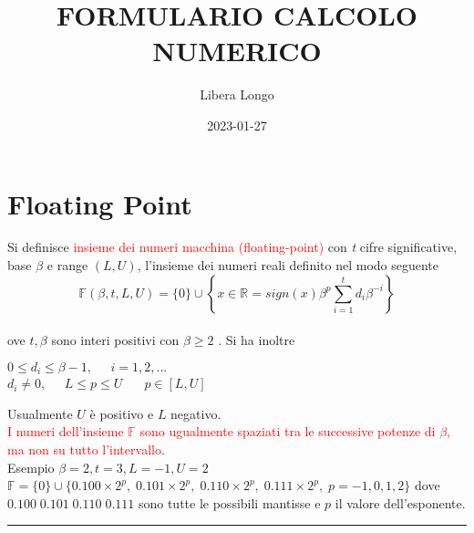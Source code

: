 \documentclass{article}
\title{FORMULARIO CALCOLO NUMERICO}
\date{2023-01-27}
\author{Libera Longo}
\begin{document}
	\maketitle
	\section{Floating Point}

Si definisce \textcolor{red}{insieme dei numeri macchina (floating-point)} con \textit{t} cifre significative,
base $\beta$ e range $( L, U )$, l'insieme dei numeri reali definito nel modo seguente
\[
	\mathbb{F} ( \beta , t, L, U ) = \{ 0  \} \cup \left \{ x \in \mathbb{R} = sign(x) \beta^p \sum_{i=1}^{t} d_{i} \beta^{-i} \right \}
\] \\
ove $t, \beta$ sono interi positivi con {\color{blue} $ \beta \geq 2 $ }.
Si ha inoltre
\begin{center}
	{\color{blue} $ 0 \leq d_i \leq \beta -1, \;\;\;\;\; i = 1, 2,... $} \\
	{\color{blue} $ d_i \neq 0, \;\;\;\;\; L \leq p \leq U $ } $ \;\;\;\;\; p \in \left [ L, U \right ] $
\end{center}
Usualmente $U$ è positivo e $L$ negativo. \\
\textcolor{red}{I numeri dell'insieme $\mathbb{F}$ sono ugualmente spaziati tra le successive potenze di $\beta$, ma non su tutto l'intervallo.} \\
Esempio
$\beta = 2, t = 3, L = -1, U = 2 $ \\
$\mathbb{F} = \{ 0 \} \cup \{ 0.100 \times 2^p, \; 0.101 \times 2^p, \; 0.110 \times 2^p, \; 0.111 \times 2^p , \; p = -1, 0, 1, 2 \} $
dove $0.100 \; 0.101 \; 0.110 \; 0.111$ sono tutte le possibili mantisse e $p$ il valore dell'esponente.

\noindent\rule{\textwidth}{0.4pt}
\end{document}
